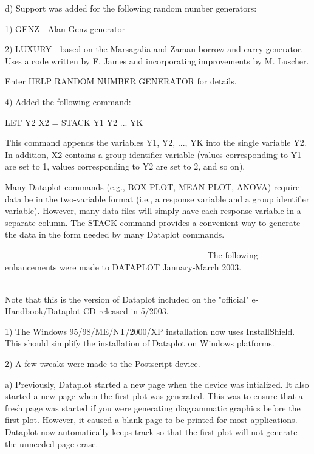 {     d) Support was added for the following random number
        generators:

 
        1) GENZ - Alan Genz generator

        2) LUXURY - based on the Marsagalia and Zaman
           borrow-and-carry generator.  Uses a code written
           by F. James and incorporating improvements by
           M. Luscher.

        Enter HELP RANDOM NUMBER GENERATOR for details.

 4) Added the following command:

       LET Y2 X2 = STACK Y1 Y2 ... YK

    This command appends the variables Y1, Y2, ..., YK into
    the single variable Y2.  In addition, X2 contains a
    group identifier variable (values corresponding to Y1 are
    set to 1, values corresponding to Y2 are set to 2, and so on).

    Many Dataplot commands (e.g., BOX PLOT, MEAN PLOT, ANOVA)
    require data be in the two-variable format (i.e., a response
    variable and a group identifier variable).  However, many
    data files will simply have each response variable in a
    separate column.  The STACK command provides a convenient
    way to generate the data in the form needed by many Dataplot
    commands.


-----------------------------------------------------------------------
The following enhancements were made to DATAPLOT January-March    2003.
-----------------------------------------------------------------------

 Note that this is the version of Dataplot included on the
 "official" e-Handbook/Dataplot CD released in 5/2003.

 1) The Windows 95/98/ME/NT/2000/XP installation now uses
    InstallShield.  This should simplify the installation of
    Dataplot on Windows platforms.

 2) A few tweaks were made to the Postscript device.

    a) Previously, Dataplot started a new page when the device
       was intialized.  It also started a new page when the first
       plot was generated.  This was to ensure that a fresh
       page was started if you were generating diagrammatic
       graphics before the first plot.  However, it caused
       a blank page to be printed for most applications.
       Dataplot now automatically keeps track so that the first
       plot will not generate the unneeded page erase.

}
